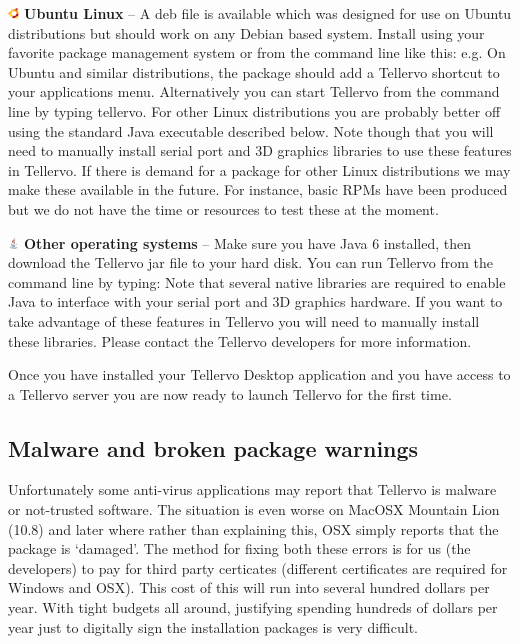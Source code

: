 \begin{description}
\item \includegraphics[width=3mm]{Images/ubuntu.png} \textbf{Ubuntu Linux} --  A deb file is available which was designed for use on Ubuntu distributions but should work on any Debian based system. Install using your favorite package management system or from the command line like this: e.g.  On Ubuntu and similar distributions, the package should add a Tellervo shortcut to your applications menu. Alternatively you can start Tellervo from the command line by typing tellervo.  For other Linux distributions you are probably better off using the standard Java executable described below.  Note though that you will need to manually install serial port and 3D graphics libraries to use these features in Tellervo.  If there is demand for a package for other Linux distributions we may make these available in the future.  For instance, basic RPMs have been produced but we do not have the time or resources to test these at the moment.

\item \includegraphics[width=3mm]{Images/java.png} \textbf{Other operating systems} -- Make sure you have Java 6 installed, then download the Tellervo jar file to your hard disk. You can run Tellervo from the command line by typing:   Note that several native libraries are required to enable Java to interface with your serial port and 3D graphics hardware.  If you want to take advantage of these features in Tellervo you will need to manually install these libraries.  Please contact the Tellervo developers for more information.
\end{description}

Once you have installed your Tellervo Desktop application and you have access to a Tellervo server you are now ready to launch Tellervo for the first time.


\subsection{Malware and broken package warnings}
\label{txt:malware}
Unfortunately some anti-virus applications may report that Tellervo is malware or not-trusted software.  The situation is even worse on MacOSX Mountain Lion (10.8) and later where rather than explaining this, OSX simply reports that the package is `damaged'.  The method for fixing both these errors is for us (the developers) to pay for third party certicates (different certificates are required for Windows and OSX).  This cost of this will run into several hundred dollars per year.  With tight budgets all around, justifying spending hundreds of dollars per year just to digitally sign the installation packages is very difficult.   

